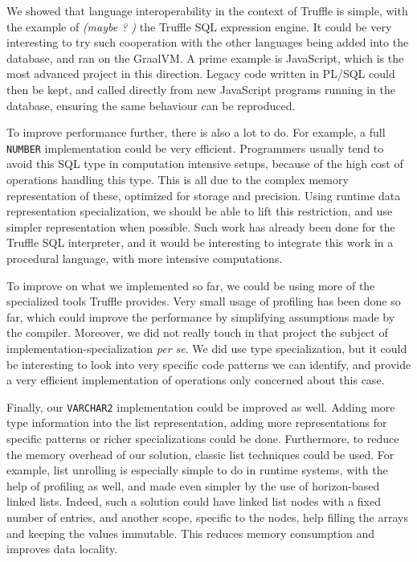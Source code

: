 \documentclass[twoside,11pt,a4paper]{article}
\newcommand{\maybe}[1]{\textit{(maybe ? #1)}}
\newcommand{\pls}[1]{\small\texttt{#1}\normalsize}
\newcommand{\plstype}[1]{\pls{#1}}
\newcommand{\varchar}{\plstype{VARCHAR2}}
\newcommand{\oranum}{\plstype{NUMBER}}
\begin{document}
We showed that language interoperability in the context of Truffle is simple, with the example of \maybe{} the Truffle SQL expression engine. It could be very interesting to try such cooperation with the other languages being added into the database, and ran on the GraalVM. A prime example is JavaScript, which is the most advanced project in this direction. Legacy code written in PL/SQL could then be kept, and called directly from new JavaScript programs running in the database, ensuring the same behaviour can be reproduced.

To improve performance further, there is also a lot to do. For example, a full \oranum{} implementation could be very efficient. Programmers usually tend to avoid this SQL type in computation intensive setups, because of the high cost of operations handling this type. This is all due to the complex memory representation of these, optimized for storage and precision. Using runtime data representation specialization, we should be able to lift this restriction, and use simpler representation when possible. Such work has already been done for the Truffle SQL interpreter, and it would be interesting to integrate this work in a procedural language, with more intensive computations.

To improve on what we implemented so far, we could be using more of the specialized tools Truffle provides. Very small usage of profiling has been done so far, which could improve the performance by simplifying assumptions made by the compiler. Moreover, we did not really touch in that project the subject of implementation-specialization \textit{per se}. We did use type specialization, but it could be interesting to look into very specific code patterns we can identify, and provide a very efficient implementation of operations only concerned about this case.

Finally, our \varchar{} implementation could be improved as well. Adding more type information into the list representation, adding more representations for specific patterns or richer specializations could be done. Furthermore, to reduce the memory overhead of our solution, classic list techniques could be used. For example, list unrolling is especially simple to do in runtime systems, with the help of profiling as well, and made even simpler by the use of horizon-based linked lists. Indeed, such a solution could have linked list nodes with a fixed number of entries, and another scope, specific to the nodes, help filling the arrays and keeping the values immutable. This reduces memory consumption and improves data locality.
\end{document}
